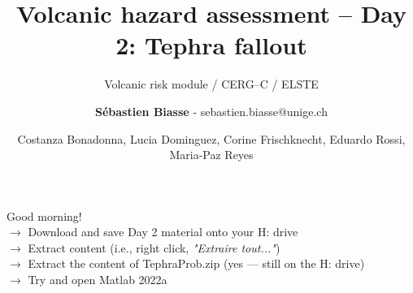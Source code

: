 \documentclass[10pt,aspectratio=169]{beamer}
\title{Volcanic hazard assessment -- Day 2: Tephra fallout}
\subtitle{\normalsize Volcanic risk module / CERG--C / ELSTE}
\date{\vspace*{.5em} \footnotesize Costanza Bonadonna, Lucia Dominguez, Corine Frischknecht, Eduardo Rossi, Maria-Paz Reyes}
\author{\textbf{Sébastien Biasse} - sebastien.biasse@unige.ch}
\institute{11 May 2022}
\begin{document}
\maketitle 

\begin{frame}[standout]
  \alert{Good morning!}\\ \vspace*{0.5em}
  \textnormal{
  $\rightarrow$ Download and save Day 2 material \alert{onto your H: drive}\\ \vspace*{0.5em}
  $\rightarrow$ \alert{Extract} content (i.e., right click, \textit{"Extraire tout..."})\\ \vspace*{0.5em}
  $\rightarrow$ \alert{Extract} the content of \alert{TephraProb.zip} (yes --- still on the H: drive)\\ \vspace*{0.5em}
  $\rightarrow$ Try and open \alert{Matlab 2022a}\\
  }
\end{frame}
\end{document}
